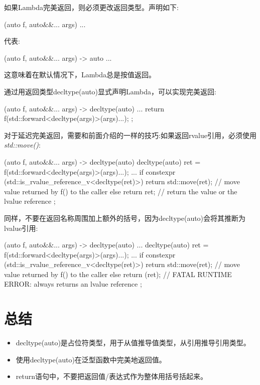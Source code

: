 
如果Lambda完美返回，则必须更改返回类型。声明如下:\par

\begin{codebox}[cpp]
  [] (auto f, auto&&... args) {
    ...
  }
\end{codebox}

代表:\par

\begin{codebox}[cpp]
  [] (auto f, auto&&... args) -> auto {
    ...
  }
\end{codebox}

这意味着在默认情况下，Lambda总是按值返回。\par

通过用返回类型decltype(auto)显式声明Lambda，可以实现完美返回:\par

\begin{codebox}[cpp]
  [] (auto f, auto&&... args) -> decltype(auto) {
    ...
    return f(std::forward<decltype(args)>(args)...);
  };
\end{codebox}

对于延迟完美返回，需要和前面介绍的一样的技巧:如果返回rvalue引用，必须使用\textit{std::move()}:\par

\begin{codebox}[cpp]
[] (auto f, auto&&... args) -> decltype(auto) {
  decltype(auto) ret = f(std::forward<decltype(args)>(args)...);
  ...
  if constexpr (std::is_rvalue_reference_v<decltype(ret)>) {
    return std::move(ret); // move value returned by f() to the caller
  }
  else {
    return ret; // return the value or the lvalue reference
  }
};
\end{codebox}

同样，不要在返回名称周围加上额外的括号，因为decltype(auto)会将其推断为lvalue引用:\par

\begin{codebox}[cpp]
[] (auto f, auto&&... args) -> decltype(auto) {
  ...
  decltype(auto) ret = f(std::forward<decltype(args)>(args)...);
  ...
  if constexpr (std::is_rvalue_reference_v<decltype(ret)>) {
    return std::move(ret); // move value returned by f() to the caller
  }
  else {
    return (ret); // FATAL RUNTIME ERROR: always returns an lvalue reference
  }
};
\end{codebox}


\section{总结}

\begin{itemize}
  \item decltype(auto)是占位符类型，用于从值推导值类型，从引用推导引用类型。
  \item 使用decltype(auto)在泛型函数中完美地返回值。
  \item return语句中，不要把返回值/表达式作为整体用括号括起来。
\end{itemize}
